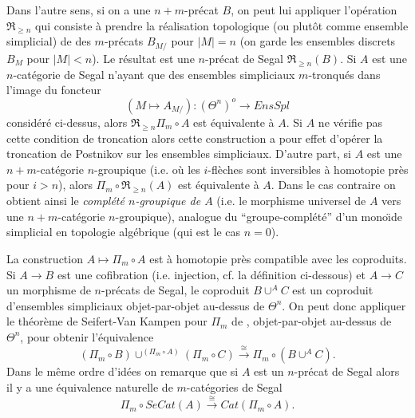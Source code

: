 \documentclass[12pt]{article}
\begin{document}
Dans l'autre sens, si on a une $n+m$-pr\'ecat $B$, on peut lui appliquer
l'op\'eration $\Re _{\geq n}$ qui consiste \`a prendre la r\'ealisation
topologique (ou plut\^ot comme ensemble simplicial) de \cite{Tamsamani} des
$m$-pr\'ecats $B_{M/}$ pour $|M|=n$ (on garde les ensembles discrets $B_M$ pour
$|M|<n$). Le r\'esultat est une $n$-pr\'ecat de Segal
$\Re _{\geq n}(B)$. Si $A$ est une $n$-cat\'egorie de Segal n'ayant que des
ensembles simpliciaux $m$-tronqu\'es dans l'image du foncteur
$$
(M\mapsto A_{M/}): (\Theta ^n )^o\rightarrow EnsSpl
$$
consid\'er\'e ci-dessus, alors $\Re _{\geq n}\Pi _m\circ A$ est
\'equivalente \`a
$A$. Si $A$
ne v\'erifie pas cette condition de troncation alors cette construction a
pour effet
d'op\'erer la troncation de Postnikov sur les ensembles simpliciaux.
D'autre part,
si $A$ est une $n+m$-cat\'egorie $n$-groupique (i.e. o\`u les $i$-fl\`eches sont
inversibles \`a homotopie pr\`es pour $i>n$), alors $\Pi _m\circ \Re _{\geq
n}(A)$
est \'equivalente \`a $A$. Dans le cas contraire on obtient ainsi le
{\em compl\'et\'e $n$-groupique de $A$} (i.e. le morphisme universel
de $A$ vers une $n+m$-cat\'egorie $n$-groupique),
analogue du ``groupe-compl\'et\'e'' d'un
mono\"{\i}de simplicial en topologie alg\'ebrique (qui est le cas $n=0$).

La construction $A\mapsto \Pi _{m}\circ A$ est \`a homotopie pr\`es compatible
avec les coproduits. Si $A\rightarrow B$ est une cofibration (i.e. injection,
cf. la d\'efinition ci-dessous) et $A\rightarrow C$ un morphisme de
$n$-pr\'ecats
de Segal, le coproduit $B\cup ^AC$ est un coproduit d'ensembles simpliciaux
objet-par-objet au-dessus de $\Theta ^n$. On peut donc appliquer le th\'eor\`eme
de Seifert-Van Kampen pour $\Pi _m$ de \cite{nCAT}, objet-par-objet au-dessus de
$\Theta ^n$, pour obtenir l'\'equivalence
$$
(\Pi _m \circ B)\cup ^{(\Pi _m \circ A)}(\Pi _m \circ C)
\stackrel{\cong}{\rightarrow}
\Pi _m \circ (B\cup ^AC).
$$
Dans le m\^eme ordre d'id\'ees on remarque que si $A$ est un $n$-pr\'ecat
de Segal
alors il y a une \'equivalence naturelle de $m$-cat\'egories de Segal
$$
\Pi _m \circ SeCat(A) \stackrel{\cong}{\rightarrow} Cat(\Pi _m \circ A).
$$
\end{document}
